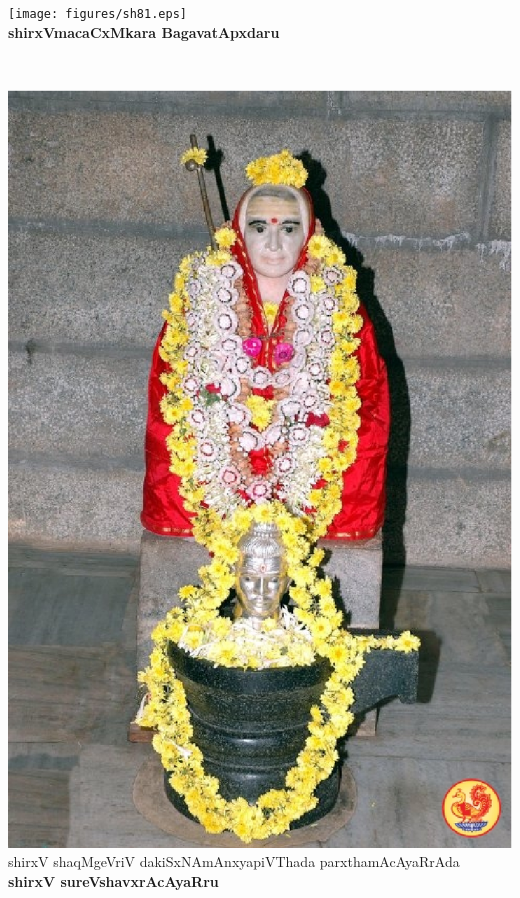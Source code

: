 \thispagestyle{empty}
\begin{center}
\vfill
\thispagestyle{empty}
\texttt{[image: figures/sh81.eps]}\\
{\bf shirxVmacaCxMkara BagavatApxdaru}
\vfill
\end{center}
\newpage
~\thispagestyle{empty}
\newpage
\begin{center}
\vfill
\thispagestyle{empty}
\includegraphics{figures/sri-sureshwaracharya.eps}\\
shirxV shaqMgeVriV dakiSxNAmAnxyapiVThada parxthamAcAyaRrAda\\ {\bf shirxV sureVshavxrAcAyaRru}
\vfill
\end{center}
\newpage
~\thispagestyle{empty}
\newpage
